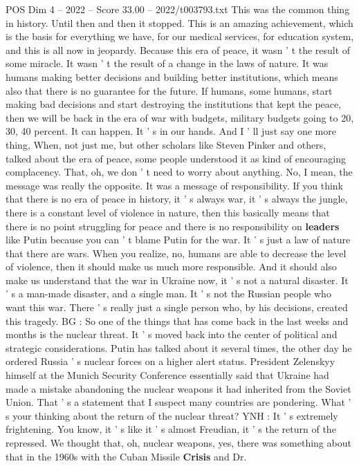 \begin{textsample}{POS Dim 4 – 2022 – Score 33.00 – 2022/t003793.txt}
This was the common thing in history.
Until then and then it stopped.
This is an amazing achievement, which is the basis for everything we have, for our medical services, for education system, and this is all now in jeopardy.
Because this era of peace, it wasn ' t the result of some miracle.
It wasn ' t the result of a change in the laws of nature.
It was humans making better decisions and building better institutions, which means also that there is no guarantee for the future.
If humans, some humans, start making bad decisions and start destroying the institutions that kept the peace, then we will be back in the era of war with budgets, military budgets going to 20, 30, 40 percent.
It can happen.
It ' s in our hands.
And I ' ll just say one more thing, When, not just me, but other scholars like Steven Pinker and others, talked about the era of peace, some people understood it as kind of encouraging complacency.
That, oh, we don ' t need to worry about anything.
No, I mean, the message was really the opposite.
It was a message of responsibility.
If you think that there is no era of peace in history, it ' s always war, it ' s always the jungle, there is a constant level of violence in nature, then this basically means that there is no point struggling for peace and there is no responsibility on \textbf{leaders} like Putin because you can ' t blame Putin for the war.
It ' s just a law of nature that there are wars.
When you realize, no, humans are able to decrease the level of violence, then it should make us much more responsible.
And it should also make us understand that the war in Ukraine now, it ' s not a natural disaster.
It ' s a man-made disaster, and a single man.
It ' s not the Russian people who want this war.
There ' s really just a single person who, by his decisions, created this tragedy.
BG : So one of the things that has come back in the last weeks and months is the nuclear threat.
It ' s moved back into the center of political and strategic considerations.
Putin has talked about it several times, the other day he ordered Russia ' s nuclear forces on a higher alert status.
President Zelenskyy himself at the Munich Security Conference essentially said that Ukraine had made a mistake abandoning the nuclear weapons it had inherited from the Soviet Union.
That ' s a statement that I suspect many countries are pondering.
What ' s your thinking about the return of the nuclear threat?
YNH : It ' s extremely frightening.
You know, it ' s like it ' s almost Freudian, it ' s the return of the repressed.
We thought that, oh, nuclear weapons, yes, there was something about that in the 1960s with the Cuban Missile \textbf{Crisis} and Dr.

\end{textsample}
